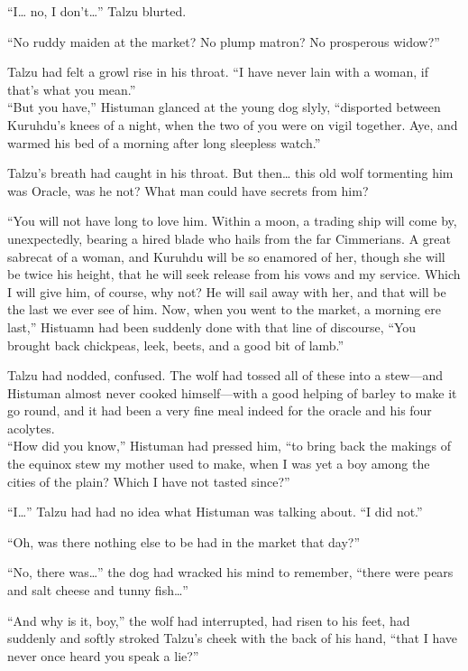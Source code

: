 ``I\ldots{} no, I don't\ldots'' Talzu blurted.

``No ruddy maiden at the market? No plump matron? No prosperous widow?''

Talzu had felt a growl rise in his throat. ``I have never lain with a woman, if that's what you mean.''\\
``But you have,'' Histuman glanced at the young dog slyly, ``disported between Kuruhdu's knees of a night, when the two of you were on vigil together. Aye, and warmed his bed of a morning after long sleepless watch.''

Talzu's breath had caught in his throat. But then\ldots{} this old wolf tormenting him was Oracle, was he not? What man could have secrets from him?

``You will not have long to love him. Within a moon, a trading ship will come by, unexpectedly, bearing a hired blade who hails from the far Cimmerians. A great sabrecat of a woman, and Kuruhdu will be so enamored of her, though she will be twice his height, that he will seek release from his vows and my service. Which I will give him, of course, why not? He will sail away with her, and that will be the last we ever see of him. Now, when you went to the market, a morning ere last,'' Histuamn had been suddenly done with that line of discourse, ``You brought back chickpeas, leek, beets, and a good bit of lamb.''

Talzu had nodded, confused. The wolf had tossed all of these into a stew---and Histuman almost never cooked himself---with a good helping of barley to make it go round, and it had been a very fine meal indeed for the oracle and his four acolytes.\\
``How did you know,'' Histuman had pressed him, ``to bring back the makings of the equinox stew my mother used to make, when I was yet a boy among the cities of the plain? Which I have not tasted since?''

``I\ldots'' Talzu had had no idea what Histuman was talking about. ``I did not.''

``Oh, was there nothing else to be had in the market that day?''

``No, there was\ldots'' the dog had wracked his mind to remember, ``there were pears and salt cheese and tunny fish\ldots''

``And why is it, boy,'' the wolf had interrupted, had risen to his feet, had suddenly and softly stroked Talzu's cheek with the back of his hand, ``that I have never once heard you speak a lie?''

